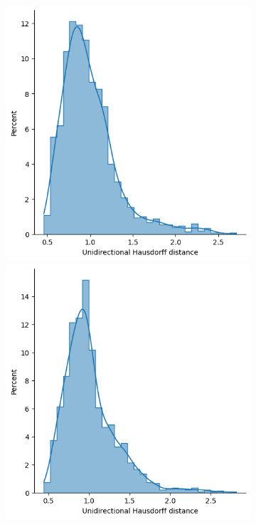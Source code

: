 \begin{figure}[htb]
\begin{subfigure}[t]{\textwidth+20pt\relax}
            \includegraphics[width=\dimexpr\linewidth-20pt\relax]{figures/ensemble/all_udhs.png}
            \includegraphics[width=\dimexpr\linewidth-20pt\relax]{figures/imle/all_udhs.png}

\end{subfigure}
\end{figure}
